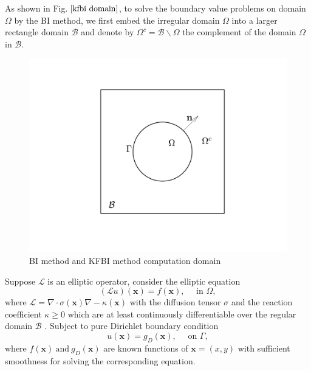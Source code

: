 \documentclass{article}
\begin{document}
As shown in Fig.\,$\ref{kfbi domain}$, to solve the boundary value problems on domain $\Omega$ by the BI method, we first embed the irregular domain $\Omega$ into a larger rectangle domain $\mathcal{B}$ and denote by $\Omega^{c} = \mathcal{B} \backslash \Omega$ the complement of the domain $\Omega$ in $\mathcal{B}$. 

\begin{figure}[ht]
    \centering
    \includegraphics[width = 0.8\linewidth]{one_gpu_kfbi1.png}
    \caption{BI method and KFBI method computation domain}
    \label{kfbi domain}
\end{figure}

Suppose $\mathcal{L}$ is an elliptic operator, consider the elliptic equation 
\begin{equation}
   (\mathcal{L} u)(\mathbf{x}) =f(\mathbf{x}), \quad \text { in } \Omega,
    \label{one_GPU:PDE}
\end{equation}
where $\mathcal{L} = \nabla \cdot \sigma(\mathbf{x}) \nabla-\kappa(\mathbf{x})$ with the diffusion tensor $\sigma$ and the reaction coefficient $\kappa \geq 0$ which are at least continuously differentiable over the regular domain $\mathcal{B}$ \cite{ying2007kernel}. Subject to pure Dirichlet boundary condition 
\begin{equation}
    u(\mathbf{x}) = g_{D}(\mathbf{x}), \quad \text{ on }\Gamma,
    \label{one_GPU:PDE_D_BC}
\end{equation}
where $f(\mathbf{x})\ \mbox{and}\ g_D(\mathbf{x})$  are known functions of $\mathbf{x}=(x, y)$ with sufficient smoothness for solving the corresponding equation.
\end{document}
